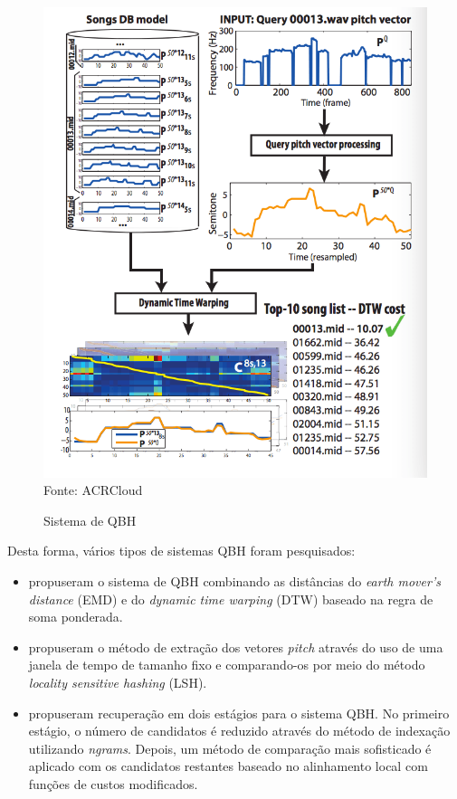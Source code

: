 \begin{figure}[!htb]
   \centering
   \caption{Sistema de QBH}\label{fig:qbhProcesso} 
   \includegraphics[scale=0.95]{figuras/query_by_humming.png}
   \\Fonte: ACRCloud
\end{figure}

Desta forma, vários tipos de sistemas QBH foram pesquisados:
\begin{itemize}
    \item {} propuseram o sistema de QBH combinando as distâncias do \textit{earth mover’s distance} (EMD) e do \textit{dynamic time warping} (DTW) baseado na regra de soma ponderada.
    \item {} propuseram o método de extração dos vetores \textit{pitch} através do uso de uma janela de tempo de tamanho fixo e comparando-os por meio do método \textit{locality sensitive hashing} (LSH).
    \item {} propuseram recuperação em dois estágios para o sistema QBH. No primeiro estágio, o número de candidatos é reduzido através do método de indexação utilizando \textit{ngrams}. Depois, um método de comparação mais sofisticado é aplicado com os candidatos restantes baseado no alinhamento local com funções de custos modificados.
\end{itemize}

